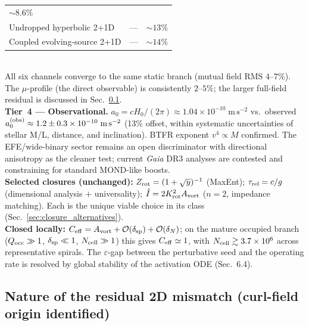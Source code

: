 \documentclass[11pt]{article}
\begin{document}
{{\begin{tabular}{@{}p{5.5cm}cc@{}}
  \footnotesize$\sim\!8.6\%$ \\
\footnotesize Undropped hyperbolic 2+1D &
  \footnotesize--- &
  \footnotesize$\sim\!13\%$ \\
\footnotesize Coupled evolving-source 2+1D &
  \footnotesize--- &
  \footnotesize$\sim\!14\%$ \\
\end{tabular}\\[0.2em]
All six channels converge to the same static branch (mutual field RMS
$4$--$7\%$).  The $\mu$-profile (the direct observable)
is consistently $2$--$5\%$; the larger full-field residual is
discussed in Sec.~\ref{sec:2d_mismatch}.\\[0.3em]
%
\textbf{Tier~4 --- Observational.}
$a_0=cH_0/(2\pi)\approx1.04\times10^{-10}\;\mathrm{m\,s^{-2}}$
vs.\ observed $a_0^{\rm(obs)}\approx1.2\pm0.3\times10^{-10}
\;\mathrm{m\,s^{-2}}$ (13\% offset, within systematic
uncertainties of stellar M/L, distance, and inclination).
BTFR exponent $v^4\propto M$ confirmed.  The EFE/wide-binary
sector remains an open discriminator with directional anisotropy as
the cleaner test; current \emph{Gaia} DR3 analyses are contested and
constraining for standard MOND-like boosts.\\[0.5em]
%
\textbf{Selected closures (unchanged):} $Z_{\rm rot}=(1+\sqrt{y})^{-1}$
(MaxEnt); $\tau_{\rm rel}=c/g$ (dimensional analysis $+$
universality); $\hat I=2K_{\rm rot}^2A_{\rm vort}$ ($n=2$,
impedance matching).  Each is the unique viable choice in its
class (Sec.~\ref{sec:closure_alternatives}).\\[0.3em]
%
\textbf{Closed locally:} $C_{\rm eff}=A_{\rm vort}
+\mathcal{O}(\delta_{\rm sp})+\mathcal{O}(\delta_N)$; on the
mature occupied branch ($Q_{\rm occ}\gg1$, $\delta_{\rm sp}\ll1$,
$N_{\rm cell}\gg1$) this gives $C_{\rm eff}\simeq1$, with
$N_{\rm cell}\gtrsim3.7\times10^6$ across representative spirals.
The $\varepsilon$-gap between the perturbative seed and the
operating rate is resolved by global stability of the activation
ODE (Sec.~6.4).}}

\subsection{Nature of the residual 2D mismatch (curl-field origin identified)}\label{sec:2d_mismatch}
\end{document}
